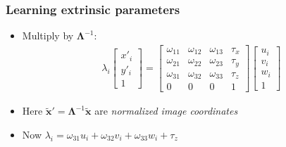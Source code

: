 \documentclass{beamer}
\begin{document}
\begin{frame}
  \frametitle{Learning extrinsic parameters}
  \begin{itemize}[<+->]
    \item Multiply by $\boldsymbol{\Lambda}^{-1}$:
    \begin{align*}
      \lambda_i \begin{bmatrix}
        x'_i \\ y'_i \\ 1
      \end{bmatrix} =
      \begin{bmatrix}
        \omega_{11} & \omega_{12} & \omega_{13} & \tau_x \\
        \omega_{21} & \omega_{22} & \omega_{23} & \tau_y \\
        \omega_{31} & \omega_{32} & \omega_{33} & \tau_z \\
        0 & 0 & 0 & 1
      \end{bmatrix} \begin{bmatrix}
        u_i \\ v_i \\ w_i \\ 1
      \end{bmatrix}
      \end{align*}
    \item Here $\mathbf{\tilde{x}'} =
      \boldsymbol{\Lambda}^{-1}\mathbf{\tilde{x}}$ are \emph{normalized image
      coordinates}
    \item Now $\lambda_i = \omega_{31}u_i+\omega_{32}v_i+\omega_{33}w_i+\tau_z$

  \end{itemize}
\end{frame}

\setcounter{MaxMatrixCols}{20}
\end{document}
